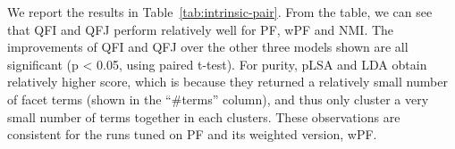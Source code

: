 We report the results in Table~\ref{tab:intrinsic-pair}. From the table, we can see that QFI and QFJ perform relatively well for PF, wPF and NMI. The improvements of QFI and QFJ over the other three models shown are all significant (p < 0.05, using paired t-test). For purity, pLSA and LDA obtain relatively higher score, which is because they returned a relatively small number of facet terms (shown in the ``\#terms'' column), and thus only cluster a very small number of terms together in each clusters.  These observations are consistent for the runs tuned on PF and its weighted version, wPF.


